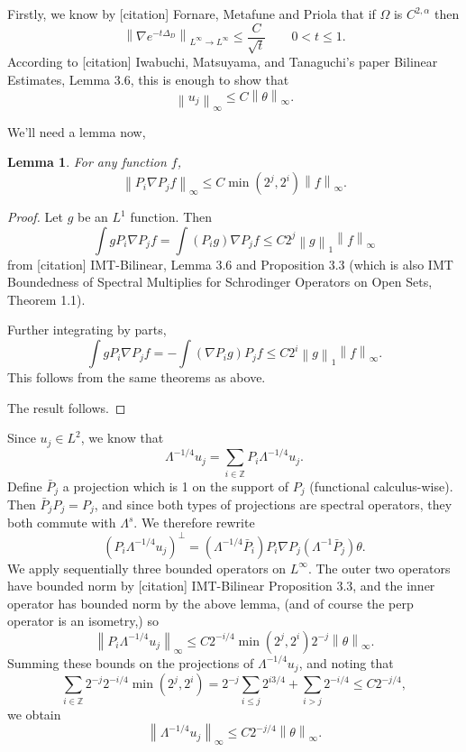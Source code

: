 \documentclass[11pt]{amsart}
\newtheorem{lemma}[theorem]{Lemma}
\theoremstyle{remark}
\newcommand{\Z}{\mathbb{Z}}
\newcommand{\norm}[1]{\left\lVert#1\right\rVert}
\newcommand{\paren}[1]{\left( #1 \right)}
\newcommand{\grad}{\nabla}
\newcommand{\Laplace}{\Delta}
\begin{document}
Firstly, we know by [citation] Fornare, Metafune and Priola that if $\Omega$ is $C^{2,\alpha}$ then
\[ \norm{\grad e^{-t\Laplace_D}}_{L^\infty \to L^\infty} \leq \frac{C}{\sqrt{t}} \qquad 0 < t \leq 1. \]
According to [citation] Iwabuchi, Matsuyama, and Tanaguchi's paper Bilinear Estimates, Lemma 3.6, this is enough to show that
\[ \norm{u_j}_\infty \leq C \norm{\theta}_\infty. \]

We'll need a lemma now,
\begin{lemma}
For any function $f$,
\[ \norm{P_i \grad P_j f}_\infty \leq C \min(2^j,2^i) \norm{f}_\infty. \]
\end{lemma}
\begin{proof}
Let $g$ be an $L^1$ function.  Then
\[ \int g P_i \grad P_j f = \int (P_i g) \grad P_j f \leq C 2^j \norm{g}_1 \norm{f}_\infty \]
from [citation] IMT-Bilinear, Lemma 3.6 and Proposition 3.3 (which is also IMT Boundedness of Spectral Multiplies for Schrodinger Operators on Open Sets, Theorem 1.1).  

Further integrating by parts,
\[ \int g P_i \grad P_j f = - \int (\grad P_i g) P_j f \leq C 2^i \norm{g}_1 \norm{f}_\infty. \]
This follows from the same theorems as above.  

The result follows.  
\end{proof}

Since $u_j \in L^2$, we know that
\[ \Lambda^{-1/4} u_j = \sum_{i \in \Z} P_i \Lambda^{-1/4} u_j. \]
Define $\bar{P}_j$ a projection which is 1 on the support of $P_j$ (functional calculus-wise).  Then $\bar{P}_j P_j = P_j$, and since both types of projections are spectral operators, they both commute with $\Lambda^s$.  We therefore rewrite
\[ \paren{P_i \Lambda^{-1/4} u_j}^\perp = \paren{\Lambda^{-1/4} \bar{P}_i} P_i \grad P_j \paren{\Lambda^{-1} \bar{P}_j} \theta. \]
We apply sequentially three bounded operators on $L^\infty$.  The outer two operators have bounded norm by [citation] IMT-Bilinear Proposition 3.3, and the inner operator has bounded norm by the above lemma, (and of course the perp operator is an isometry,) so 
\[ \norm{ P_i \Lambda^{-1/4} u_j}_\infty \leq C 2^{-i/4} \min(2^j, 2^i) 2^{-j} \norm{\theta}_\infty. \]
%
Summing these bounds on the projections of $\Lambda^{-1/4} u_j$, and noting that
\[ \sum_{i \in \Z} 2^{-j} 2^{-i/4} \min(2^j,2^i) = 2^{-j} \sum_{i \leq j} 2^{i 3/4} + \sum_{i>j} 2^{-i/4} \leq C 2^{-j/4}, \]
we obtain
\[ \norm{\Lambda^{-1/4} u_j}_\infty \leq C 2^{-j/4} \norm{\theta}_\infty. \]
\end{document}
